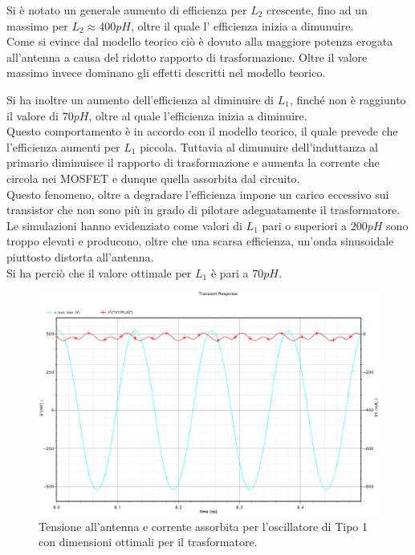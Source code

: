 \documentclass[a4paper, 12pt]{memoir}
\begin{document}
Si è notato un generale aumento di efficienza per $L_2$ crescente, fino ad un
massimo per $L_2 \approx 400pH$, oltre il quale l' efficienza inizia a
dimunuire.\\
Come si evince dal modello teorico ciò è dovuto alla maggiore potenza erogata
all'antenna a causa del ridotto rapporto di trasformazione. Oltre il valore
massimo invece dominano gli effetti descritti nel modello teorico.

Si ha inoltre un aumento dell'efficienza al diminuire di $L_1$, finché non è
raggiunto il valore di $70pH$, oltre al quale l'efficienza inizia a diminuire.
\\Questo comportamento è in accordo con il modello teorico, il quale prevede
che l'efficienza aumenti per $L_1$ piccola.  Tuttavia al dimunuire 
dell'induttanza al primario diminuisce il rapporto di trasformazione e aumenta
la corrente che circola nei MOSFET e dunque quella assorbita dal circuito.\\
Questo fenomeno, oltre a degradare l'efficienza impone un carico eccessivo sui
transistor che non sono più in grado di pilotare adeguatamente il trasformatore.
Le simulazioni hanno evidenziato come valori di $L_1$ pari o superiori a $200pH$
sono troppo elevati e producono, oltre che una scarsa efficienza, un'onda
sinusoidale piuttosto distorta all'antenna.\\
Si ha perciò che il valore ottimale per $L_1$ è pari a $70pH$.
\begin{figure}[h!]
\centering
\includegraphics[width=\textwidth]{images/Vant-It.pdf}
\caption{Tensione all'antenna e corrente assorbita per l'oscillatore di Tipo 1
      con dimensioni ottimali per il trasformatore.}
\end{figure}
\end{document}
